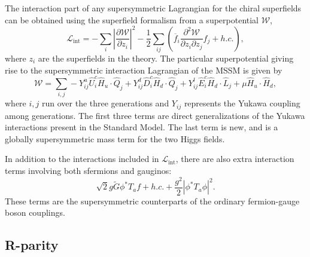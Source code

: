 The interaction part of any supersymmetric Lagrangian for the chiral superfields can be obtained
using the superfield formalism from a superpotential $\mathcal{W}$,
\begin{equation}
  \mathcal{L}_{\text{int}} = - \sum_i \left|\frac{\partial \mathcal{W}}{\partial z_i}\right|^2 -
\frac{1}{2} \sum_{ij} \left( \overline{f}_{i}\frac{\partial^
2 \mathcal{W}}{\partial z_i \partial z_j}f_j + h.c. \right) ,
  \label{eq:L_int}
\end{equation}
where $z_i$ are the superfields in the theory. 
The particular superpotential giving rise to the supersymmetric interaction Lagrangian of the MSSM
is given by
\begin{equation}
  \mathcal{W} = \sum_{i,j} - Y_{ij}^u \widehat{U}_i^c \widehat{H}_u \cdot \widehat{Q}_j + Y_{ij}^d
\widehat{D}_i^c \widehat{H}_d \cdot \widehat{Q}_j +
 Y_{ij}^l \widehat{E}_i^c \widehat{H}_d \cdot \widehat{L}_j + \mu \widehat{H}_u \cdot \widehat{H}_d
,
  \label{eq:superpotential}
\end{equation}
where $i,j$ run over the three generations and $Y_{ij}$ represents the Yukawa coupling among
generations. The first three terms are direct generalizations of the Yukawa interactions present in
the Standard Model. The last term is new, and is a globally supersymmetric mass term for the
two Higgs fields. 

In addition to the interactions included in $\mathcal{L}_{\text{int}}$, there are also extra
interaction terms involving both sfermions and gauginos:
\begin{equation}
  \sqrt{2}g\widetilde{G}\phi^*T_af + h.c. + \frac{g^2}{2} \left| \phi^* T_a\phi\right|^2 .
  \label{eq:L_extra}
\end{equation}
These terms are the supersymmetric counterparts of the ordinary fermion-gauge boson couplings. 



\subsection{R-parity}

